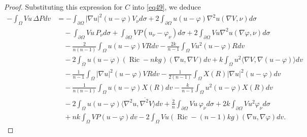 \documentclass[10pt,a4paper]{amsart}
\begin{document}
\begin{proof}
Substituting this expression for \(C\) into \eqref{eq49}, we deduce
\begin{align}\label{eq411}
-\int_{\Omega}Vu\,\Delta P dv
&=
-\int_{\partial\Omega}|\nabla u|^{2}(u-\varphi)V_{\nu} d\sigma
+2\int_{\partial\Omega}u(u-\varphi)\nabla^{2}u(\nabla V,\nu)d\sigma
\nonumber\\
&\quad
-\int_{\partial\Omega}Vu\,P_{\nu}d\sigma
+\int_{\partial\Omega}VP(u_{\nu}-\varphi_{\nu})d\sigma
+2\int_{\partial\Omega}Vu\nabla^{2}u(\nabla\varphi,\nu)d\sigma
\nonumber\\
&\quad
-\frac{2}{n(n-1)}
\int_{\Omega}u(u-\varphi)VR dv
-\frac{2k}{n-1}
\int_{\Omega}Vu^{2}(u-\varphi)R dv
\nonumber\\
&\quad
-2\int_{\Omega}u(u-\varphi)(\operatorname{Ric}-nkg)(\nabla u,\nabla V)dv
+k\int_{\Omega}u^{2}\langle\nabla V,\nabla(u-\varphi)\rangle dv
\nonumber\\
&\quad
-\frac{1}{n-1}
\int_{\Omega}|\nabla u|^{2}(u-\varphi)VR dv
-\frac{1}{2(n-1)}
\int_{\Omega}X(R)|\nabla u|^{2}(u-\varphi)dv
\nonumber\\
&\quad
-\frac{1}{n(n-1)}
\int_{\Omega}u(u-\varphi)X(R)dv
-\frac{k}{n-1}
\int_{\Omega}u^{2}(u-\varphi)X(R) dv
\nonumber\\
&\quad
-2\int_{\Omega}u(u-\varphi)
\langle\nabla^{2}u,\mathring{\nabla^{2}V}\rangle dv
+\frac{2}{n}\int_{\partial\Omega}Vu\,\varphi_{\nu}d\sigma
+2k\int_{\partial\Omega}Vu^{2}\varphi_{\nu}d\sigma
\nonumber\\
&\quad
+nk\int_{\Omega}VP(u-\varphi)dv
-2\int_{\Omega}Vu(\operatorname{Ric}-(n-1)kg)(\nabla u,\nabla\varphi)dv.
\end{align}


\end{proof}
\end{document}
